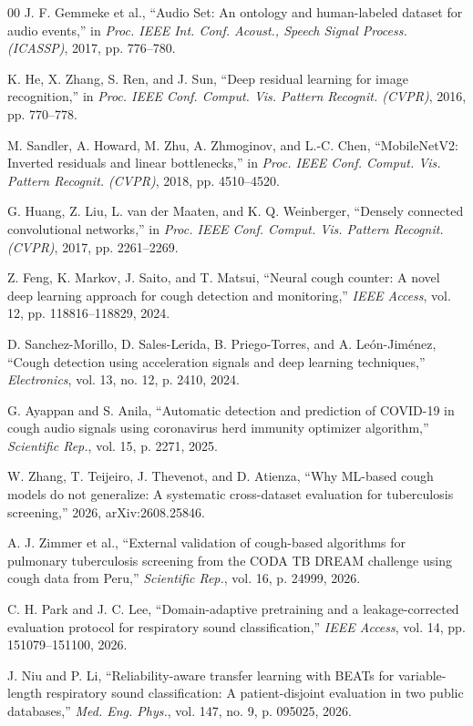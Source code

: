 \documentclass{ieeeaccess}
\begin{document}
\begin{thebibliography}{00}
J. F. Gemmeke et al., ``Audio Set: An ontology and human-labeled dataset for audio events,'' in \emph{Proc. IEEE Int. Conf. Acoust., Speech Signal Process. (ICASSP)}, 2017, pp. 776--780.

K. He, X. Zhang, S. Ren, and J. Sun, ``Deep residual learning for image recognition,'' in \emph{Proc. IEEE Conf. Comput. Vis. Pattern Recognit. (CVPR)}, 2016, pp. 770--778.

M. Sandler, A. Howard, M. Zhu, A. Zhmoginov, and L.-C. Chen, ``MobileNetV2: Inverted residuals and linear bottlenecks,'' in \emph{Proc. IEEE Conf. Comput. Vis. Pattern Recognit. (CVPR)}, 2018, pp. 4510--4520.

G. Huang, Z. Liu, L. van der Maaten, and K. Q. Weinberger, ``Densely connected convolutional networks,'' in \emph{Proc. IEEE Conf. Comput. Vis. Pattern Recognit. (CVPR)}, 2017, pp. 2261--2269.

Z. Feng, K. Markov, J. Saito, and T. Matsui, ``Neural cough counter: A novel deep learning approach for cough detection and monitoring,'' \emph{IEEE Access}, vol. 12, pp. 118816--118829, 2024.

D. Sanchez-Morillo, D. Sales-Lerida, B. Priego-Torres, and A. Le{\'o}n-Jim{\'e}nez, ``Cough detection using acceleration signals and deep learning techniques,'' \emph{Electronics}, vol. 13, no. 12, p. 2410, 2024.

G. Ayappan and S. Anila, ``Automatic detection and prediction of COVID-19 in cough audio signals using coronavirus herd immunity optimizer algorithm,'' \emph{Scientific Rep.}, vol. 15, p. 2271, 2025.

W. Zhang, T. Teijeiro, J. Thevenot, and D. Atienza, ``Why ML-based cough models do not generalize: A systematic cross-dataset evaluation for tuberculosis screening,'' 2026, arXiv:2608.25846.

A. J. Zimmer et al., ``External validation of cough-based algorithms for pulmonary tuberculosis screening from the CODA TB DREAM challenge using cough data from Peru,'' \emph{Scientific Rep.}, vol. 16, p. 24999, 2026.

C. H. Park and J. C. Lee, ``Domain-adaptive pretraining and a leakage-corrected evaluation protocol for respiratory sound classification,'' \emph{IEEE Access}, vol. 14, pp. 151079--151100, 2026.

J. Niu and P. Li, ``Reliability-aware transfer learning with BEATs for variable-length respiratory sound classification: A patient-disjoint evaluation in two public databases,'' \emph{Med. Eng. Phys.}, vol. 147, no. 9, p. 095025, 2026.


\end{thebibliography}
\end{document}
